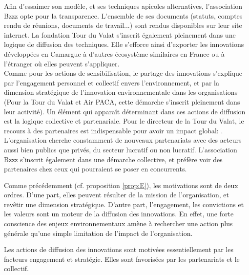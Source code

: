             Afin d'essaimer son modèle, et ses techniques apicoles alternatives, l'association Bzzz opte pour la transparence. L'ensemble de ses documents (statuts, comptes rendu de réunions, documents de travail...) sont rendus disponibles sur leur site internet. La fondation Tour du Valat s'inscrit également pleinement dans une logique de diffusion des techniques. Elle s'efforce ainsi d'exporter les innovations développées en Camargue à d'autres  écosystème similaires en France ou à l'étranger où elles peuvent s'appliquer. \\
            
            Comme pour les actions de sensibilisation, le partage des innovations s'explique par l'engagement personnel et collectif envers l'environnement, et par la dimension stratégique de l'innovation environnementale dans les organisations (Pour la Tour du Valat et Air PACA, cette démarche s'inscrit pleinement dans leur activité). Un élément qui apparaît déterminant dans ces actions de diffusion est la logique collective et partenariale. Pour le directeur de la Tour du Valat, le recours à des partenaires est indispensable pour avoir un impact global: . L'organisation cherche constamment de nouveaux partenariats avec des acteurs aussi bien publics que privés, du secteur lucratif ou non lucratif. L'association Bzzz s'inscrit également dans une démarche collective, et préfère voir des partenaires chez ceux qui pourraient se poser en concurrents. 
            
            Comme précédemment (cf. proposition \ref{prop:E}), les motivations sont de deux ordres. D'une part, elles peuvent résulter de la mission de l'organisation, et revêtir une dimension stratégique. D'autre part, l'engagement, les convictions et les valeurs sont un moteur de la diffusion des innovations. En effet, une forte conscience des enjeux environnementaux amène à rechercher une action plus générale qu'une simple limitation de l'impact de l'organisation. 

            \begin{hyp}
            \label{prop:G}
                Les actions de diffusion des innovations sont motivées essentiellement par les facteurs engagement et stratégie. Elles sont favorisées par les partenariats et le collectif.
            \end{hyp}

